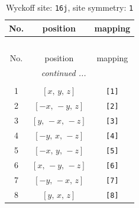 \documentclass[fleqn,8pt]{jsarticle}
\begin{document}
\renewcommand{\arraystretch}{1.2}
\begin{longtable}{ccc}
\caption{Wyckoff site: {\tt 16j}, site symmetry: {\tt 1}}
 \\
 \hline \hline
No. & position & mapping \\ \hline \endfirsthead

\multicolumn{2}{l}{\tablename\ \thetable{}} \\
 \hline \hline
No. & position & mapping \\ \hline \endhead

 \hline \hline
\multicolumn{2}{r}{\footnotesize\it continued ...} \\ \endfoot

 \hline \hline
\multicolumn{2}{r}{} \\ \endlastfoot

1 & $\left[ x,\, y,\, z \right]$ & {\tt [1]} \\ \hline
2 & $\left[ - x,\, - y,\, z \right]$ & {\tt [2]} \\ \hline
3 & $\left[ y,\, - x,\, - z \right]$ & {\tt [3]} \\ \hline
4 & $\left[ - y,\, x,\, - z \right]$ & {\tt [4]} \\ \hline
5 & $\left[ - x,\, y,\, - z \right]$ & {\tt [5]} \\ \hline
6 & $\left[ x,\, - y,\, - z \right]$ & {\tt [6]} \\ \hline
7 & $\left[ - y,\, - x,\, z \right]$ & {\tt [7]} \\ \hline
8 & $\left[ y,\, x,\, z \right]$ & {\tt [8]} \\
\end{longtable}
\end{document}
